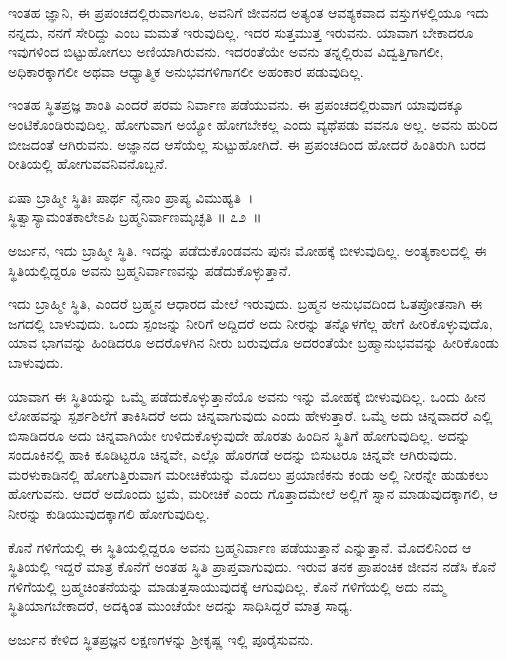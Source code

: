 ಇಂತಹ ಜ್ಞಾನಿ, ಈ ಪ್ರಪಂಚದಲ್ಲಿರುವಾಗಲೂ, ಅವನಿಗೆ ಜೀವನದ ಅತ್ಯಂತ ಆವಶ್ಯಕವಾದ ವಸ್ತುಗಳಲ್ಲಿಯೂ ಇದು ನನ್ನದು, ನನಗೆ ಸೇರಿದ್ದು ಎಂಬ ಮಮತೆ ಇರುವುದಿಲ್ಲ. ಇದರ ಸುತ್ತಮುತ್ತ ಇರುವನು. ಯಾವಾಗ ಬೇಕಾದರೂ ಇವುಗಳಿಂದ ಬಿಟ್ಟುಹೋಗಲು ಅಣಿಯಾಗಿರುವನು. ಇದರಂತೆಯೇ ಅವನು ತನ್ನಲ್ಲಿರುವ ವಿದ್ವತ್ತಿಗಾಗಲೀ, ಅಧಿಕಾರಕ್ಕಾಗಲೀ ಅಥವಾ ಆಧ್ಯಾತ್ಮಿಕ ಅನುಭವಗಳಿಗಾಗಲೀ ಅಹಂಕಾರ ಪಡುವುದಿಲ್ಲ.

ಇಂತಹ ಸ್ಥಿತಪ್ರಜ್ಞ ಶಾಂತಿ ಎಂದರೆ ಪರಮ ನಿರ್ವಾಣ ಪಡೆಯುವನು. ಈ ಪ್ರಪಂಚದಲ್ಲಿರುವಾಗ ಯಾವುದಕ್ಕೂ ಅಂಟಿಕೊಂಡಿರುವುದಿಲ್ಲ. ಹೋಗುವಾಗ ಅಯ್ಯೋ ಹೋಗಬೇಕಲ್ಲ ಎಂದು ವ್ಯಥೆಪಡು ವವನೂ ಅಲ್ಲ. ಅವನು ಹುರಿದ ಬೀಜದಂತೆ ಆಗಿರುವನು. ಅಜ್ಞಾನದ ಆಸೆಯೆಲ್ಲ ಸುಟ್ಟುಹೋಗಿದೆ. ಈ ಪ್ರಪಂಚದಿಂದ ಹೋದರೆ ಹಿಂತಿರುಗಿ ಬರದ ರೀತಿಯಲ್ಲಿ ಹೋಗುವವನಿವ\-ನೊಬ್ಬನೆ.

\begin{shloka}
ಏಷಾ ಬ್ರಾಹ್ಮೀ ಸ್ಥಿತಿಃ ಪಾರ್ಥ ನೈನಾಂ ಪ್ರಾಪ್ಯ ವಿಮುಹ್ಯತಿ~।\\ಸ್ಥಿತ್ವಾಸ್ಯಾಮಂತಕಾಲೇಽಪಿ ಬ್ರಹ್ಮನಿರ್ವಾಣಮೃಚ್ಛತಿ \hfill॥ ೭೨~॥
\end{shloka}

\begin{artha}
ಅರ್ಜುನ, ಇದು ಬ್ರಾಹ್ಮೀ ಸ್ಥಿತಿ. ಇದನ್ನು ಪಡೆದುಕೊಂಡವನು ಪುನಃ ಮೋಹಕ್ಕೆ ಬೀಳುವುದಿಲ್ಲ. ಅಂತ್ಯಕಾಲದಲ್ಲಿ ಈ ಸ್ಥಿತಿಯಲ್ಲಿದ್ದರೂ ಅವನು ಬ್ರಹ್ಮನಿರ್ವಾಣವನ್ನು ಪಡೆದುಕೊಳ್ಳುತ್ತಾನೆ.
\end{artha}

ಇದು ಬ್ರಾಹ್ಮೀ ಸ್ಥಿತಿ, ಎಂದರೆ ಬ್ರಹ್ಮನ ಆಧಾರದ ಮೇಲೆ ಇರುವುದು. ಬ್ರಹ್ಮನ ಅನುಭವದಿಂದ ಓತಪ್ರೋತನಾಗಿ ಈ ಜಗದಲ್ಲಿ ಬಾಳುವುದು. ಒಂದು ಸ್ಪಂಜನ್ನು ನೀರಿಗೆ ಅದ್ದಿದರೆ ಅದು ನೀರನ್ನು ತನ್ನೊಳಗೆಲ್ಲ ಹೇಗೆ ಹೀರಿಕೊಳ್ಳುವುದೊ, ಯಾವ ಭಾಗವನ್ನು ಹಿಂಡಿದರೂ ಅದರೊಳಗಿನ ನೀರು ಬರುವುದೊ ಅದರಂತೆಯೇ ಬ್ರಹ್ಮಾನುಭವವನ್ನು ಹೀರಿಕೊಂಡು ಬಾಳುವುದು.

ಯಾವಾಗ ಈ ಸ್ಥಿತಿಯನ್ನು ಒಮ್ಮೆ ಪಡೆದುಕೊಳ್ಳುತ್ತಾನೆಯೊ ಅವನು ಇನ್ನು ಮೋಹಕ್ಕೆ ಬೀಳುವುದಿಲ್ಲ. ಒಂದು ಹೀನ ಲೋಹವನ್ನು ಸ್ಪರ್ಶಶಿಲೆಗೆ ತಾಕಿಸಿದರೆ ಅದು ಚಿನ್ನವಾಗುವುದು ಎಂದು ಹೇಳುತ್ತಾರೆ. ಒಮ್ಮೆ ಅದು ಚಿನ್ನವಾದರೆ ಎಲ್ಲಿ ಬಿಸಾಡಿದರೂ ಅದು ಚಿನ್ನವಾಗಿಯೇ ಉಳಿದುಕೊಳ್ಳುವುದೇ ಹೊರತು ಹಿಂದಿನ ಸ್ಥಿತಿಗೆ ಹೋಗುವುದಿಲ್ಲ. ಅದನ್ನು ಸಂದೂಕಿನಲ್ಲಿ ಹಾಕಿ ಕೂಡಿಟ್ಟರೂ ಚಿನ್ನವೇ, ಎಲ್ಲೊ ಹೊರಗಡೆ ಅದನ್ನು ಬಿಸುಟರೂ ಚಿನ್ನವೇ ಆಗಿರುವುದು. ಮರಳುಕಾಡಿನಲ್ಲಿ ಹೋಗುತ್ತಿರುವಾಗ ಮರೀಚಿಕೆಯನ್ನು ಮೊದಲು ಪ್ರಯಾಣಿಕನು ಕಂಡು ಅಲ್ಲಿ ನೀರನ್ನೇ ಹುಡುಕಲು ಹೋಗುವನು. ಆದರೆ ಅದೊಂದು ಭ್ರಮೆ, ಮರೀಚಿಕೆ ಎಂದು ಗೊತ್ತಾದ\-ಮೇಲೆ ಅಲ್ಲಿಗೆ ಸ್ನಾನ ಮಾಡುವುದಕ್ಕಾಗಲಿ, ಆ ನೀರನ್ನು ಕುಡಿಯುವುದಕ್ಕಾಗಲಿ ಹೋಗುವುದಿಲ್ಲ.

ಕೊನೆ ಗಳಿಗೆಯಲ್ಲಿ ಈ ಸ್ಥಿತಿಯಲ್ಲಿದ್ದರೂ ಅವನು ಬ್ರಹ್ಮನಿರ್ವಾಣ ಪಡೆಯುತ್ತಾನೆ ಎನ್ನುತ್ತಾನೆ. ಮೊದಲಿನಿಂದ ಆ ಸ್ಥಿತಿಯಲ್ಲಿ ಇದ್ದರೆ ಮಾತ್ರ ಕೊನೆಗೆ ಅಂತಹ ಸ್ಥಿತಿ ಪ್ರಾಪ್ತವಾಗುವುದು. ಇರುವ ತನಕ ಪ್ರಾಪಂಚಿಕ ಜೀವನ ನಡೆಸಿ ಕೊನೆ ಗಳಿಗೆಯಲ್ಲಿ ಬ್ರಹ್ಮಚಿಂತನೆಯನ್ನು ಮಾಡುತ್ತ\break ಸಾಯುವುದಕ್ಕೆ ಆಗುವುದಿಲ್ಲ. ಕೊನೆ ಗಳಿಗೆಯಲ್ಲಿ ಅದು ನಮ್ಮ ಸ್ಥಿತಿಯಾಗಬೇಕಾದರೆ, ಅದಕ್ಕಿಂತ ಮುಂಚೆಯೇ ಅದನ್ನು ಸಾಧಿಸಿದ್ದರೆ ಮಾತ್ರ ಸಾಧ್ಯ.

ಅರ್ಜುನ ಕೇಳಿದ ಸ್ಥಿತಪ್ರಜ್ಞನ ಲಕ್ಷಣಗಳನ್ನು ಶ‍್ರೀಕೃಷ್ಣ ಇಲ್ಲಿ ಪೂರೈಸುವನು.

